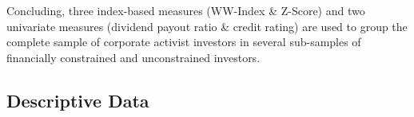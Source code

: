 \documentclass[12pt]{article}
\begin{document}
Concluding, three index-based measures (WW-Index \& Z-Score) and two univariate measures (dividend payout ratio \& credit rating) are used to group the complete sample of corporate activist investors in several sub-samples of financially constrained and unconstrained investors.


\subsection{Descriptive Data}
\end{document}

